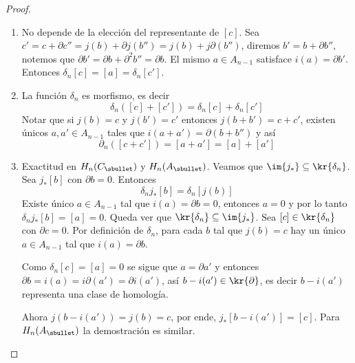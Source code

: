 \documentclass{article}
\begin{document}
\begin{proof}
\begin{enumerate}
        \item No depende de la elección del representante de $[c]$. Sea $c'=c+\partial c''
        =j(b)+\partial j(b'')=j(b)+j\partial(b'')$, diremos $b'=b+\partial b''$, notemos que
        $\partial b'=\partial b+\partial^{2}b''=\partial b$. El mismo $a\in A_{n-1}$ satisface
        $i(a)=\partial b'$. Entonces $\delta_{n}[c]=[a]=\delta_{n}[c']$.

        \item La función $\delta_{n}$ es morfismo, es decir
        \begin{equation*}
            \delta_{n}([c]+[c'])=\delta_{n}[c]+\delta_{n}[c']
        \end{equation*}
        Notar que si $j(b)=c$ y $j(b')=c'$ entonces $j(b+b')=c+c'$, existen únicos 
        $a,a'\in A_{n-1}$ tales que $i(a+a')=\partial(b+b'')$ y así
        \begin{equation*}
            \partial_{n}([c+c'])=[a+a']=[a]+[a']
        \end{equation*}

        \item Exactitud en $H_{n}(C_{\sbullet})$ y $H_{n}(A_{\sbullet})$. Veamos que 
        $\im{j_{*}}\subseteq\kr{\delta_{n}}$. Sea $j_{*}[b]$ con $\partial b=0$. Entonces
        \begin{equation*}
            \delta_{n}j_{*}[b]=\delta_{n}[j(b)]
        \end{equation*}
        Existe único $a\in A_{n-1}$ tal que $i(a)=\partial b=0$, entonces $a=0$ y por lo tanto
        $\delta_{n}j_{*}[b]=[a]=0$. Queda ver que $\kr{\delta_{n}}\subseteq\im{j_{*}}$. Sea
        $[c]\in\kr{\delta_{n}}$ con $\partial c=0$. Por definición de $\delta_{n}$, para cada
        $b$ tal que $j(b)=c$ hay un único $a\in A_{n-1}$ tal que $i(a)=\partial b$.

        \noindent Como $\delta_{n}[c]=[a]=0$ se sigue que $a=\partial a'$ y entonces 
        $\partial b=i(a)=i\partial(a')=\partial i(a')$, así $b-i(a')\in\kr{\partial}$, es decir
        $b-i(a')$ representa una clase de homología.

        \noindent Ahora $j(b-i(a'))=j(b)=c$, por ende, $j_{*}[b-i(a')]=[c]$. Para 
        $H_{n}(A_{\sbullet})$ la demostración es similar.


\end{enumerate}
\end{proof}
\end{document}
